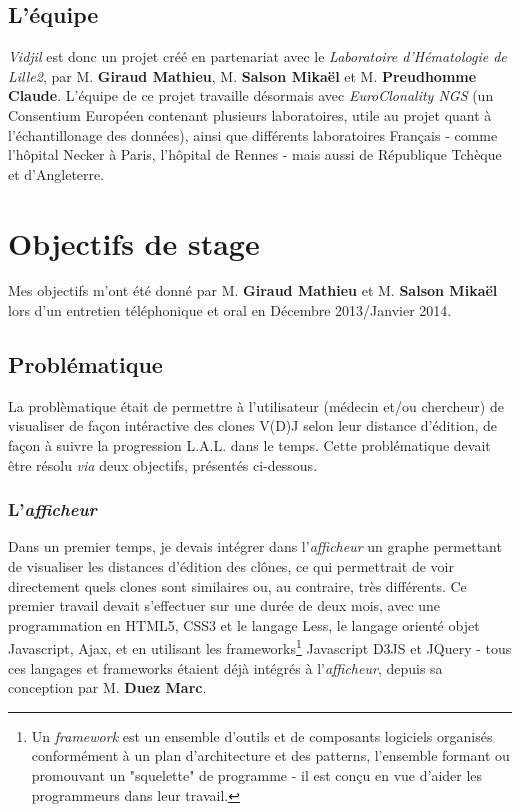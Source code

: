 \documentclass[12pt]{report}
\begin{document}
\begin{spacing}{1.2}
\subsection{L'équipe}
\textit{Vidjil} est donc un projet créé en partenariat avec le \textit{Laboratoire d'Hématologie de Lille2}, par M. \textbf{Giraud Mathieu}, M. \textbf{Salson Mikaël} et M. \textbf{Preudhomme Claude}.
\newline
L'équipe de ce projet travaille désormais avec \textit{EuroClonality NGS} (un Consentium Européen contenant plusieurs laboratoires, utile au projet quant à l'échantillonage des données), ainsi que différents laboratoires Français - comme l'hôpital Necker à Paris, l'hôpital de Rennes - mais aussi de République Tchèque et d'Angleterre.

\section{Objectifs de stage}
Mes objectifs m'ont été donné par M. \textbf{Giraud Mathieu} et M. \textbf{Salson Mikaël} lors d'un entretien téléphonique et oral en Décembre 2013/Janvier 2014.

\subsection{Problématique}
La problèmatique était de permettre à l'utilisateur (médecin et/ou chercheur) de visualiser de façon intéractive des clones V(D)J selon leur distance d'édition, de façon à suivre la progression L.A.L. dans le temps.
\newline
Cette problématique devait être résolu \textit{via} deux objectifs, présentés ci-dessous. 

\subsubsection{L'\textit{afficheur}}
Dans un premier temps, je devais intégrer dans l'\textit{afficheur} un graphe permettant de visualiser les distances d'édition des clônes, ce qui permettrait de voir directement quels clones sont similaires ou, au contraire, très différents.
\newline
Ce premier travail devait s'effectuer sur une durée de deux mois, avec une programmation en HTML5, CSS3 et le langage Less, le langage orienté objet Javascript, Ajax, et en utilisant les frameworks\footnote{Un \textit{framework} est un ensemble d'outils et de composants logiciels organisés conformément à un plan d'architecture et des patterns, l'ensemble formant ou promouvant un "squelette" de programme - il est conçu en vue d'aider les programmeurs dans leur travail.} Javascript D3JS et JQuery - tous ces langages et frameworks étaient déjà intégrés à l'\textit{afficheur}, depuis sa conception par M. \textbf{Duez Marc}.


\end{spacing}
\end{document}

